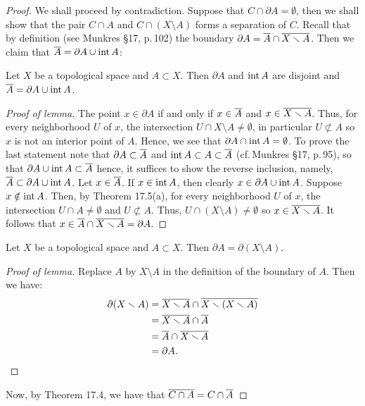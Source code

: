 \begin{proof}
We shall proceed by contradiction. Suppose that $C\cap\partial
A=\emptyset$, then we shall show that the pair $C\cap A$ and
$C\cap(X\setminus A)$ forms a separation of
$C$. Recall that by definition (see Munkres \S17, p.\,102) the
boundary $\partial A=\overline{A}\cap\overline{X\smallsetminus A}$. Then we
claim that $\overline{A}=\partial A\cup \operatorname{int} A$:
\begin{lemma}
Let $X$ be a topological space and $A\subset X$. Then $\partial
A$ and $\operatorname{int}{A}$ are disjoint and $\overline{A}=\partial A\cup\operatorname{int}
A$.
\end{lemma}
\begin{proof}[Proof of lemma]
\renewcommand\qedsymbol{$\clubsuit$}
The point $x\in\partial A$ if and only if $x\in\overline{A}$ and
$x\in\overline{X\smallsetminus A}$. Thus, for every neighborhood $U$ of
$x$, the intersection $U\cap X\setminus A\neq\emptyset$, in
particular $U\nsubset A$ so $x$ is not an interior point of
$A$. Hence, we see that $\partial A\cap\operatorname{int} A=\emptyset$. To
prove the last statement note that $\partial A\subset\overline{A}$ and
$\operatorname{int} A\subset A\subset\overline{A}$ (cf.\,Munkres \S17, p.\,95), so
that $\partial A\cup\operatorname{int} A\subset\overline{A}$ hence, it suffices to
show the reverse inclusion, namely, $\overline{A}\subset\partial
A\cup\operatorname{int} A$. Let $x\in\overline{A}$. If $x\in\operatorname{int} A$, then clearly
$x\in\partial A\cup\operatorname{int} A$. Suppose $x\notin\operatorname{int} A$. Then, by
Theorem 17.5(a), for every neighborhood $U$ of $x$, the
intersection $U\cap A\neq\emptyset$ and $U\nsubset A$. Thus,
$U\cap (X\setminus A)\neq\emptyset$ so $x\in\overline{X\smallsetminus
  A}$. It follows that $x\in\overline{A}\cap\overline{X\smallsetminus
  A}=\partial A$.
\end{proof}
\begin{lemma}
Let $X$ be a topological space and $A\subset X$. Then $\partial
A=\partial(X\setminus A)$.
\end{lemma}
\begin{proof}[Proof of lemma]
\renewcommand\qedsymbol{$\clubsuit$}
Replace $A$ by $X\setminus A$ in the definition of the boundary
of $A$. Then we have:
\begin{align*}
\partial(X\smallsetminus A)&=\overline{X\smallsetminus A}\cap
                             \overline{X\smallsetminus(X\smallsetminus A)}\\
&=\overline{X\smallsetminus A}\cap\overline{A}\\
&=\overline{A}\cap\overline{X\smallsetminus A}\\
&=\partial A.
\end{align*}
\end{proof}
Now, by Theorem 17.4, we have that $\overline{C\cap A}=C\cap\overline{A}$

\end{proof}
